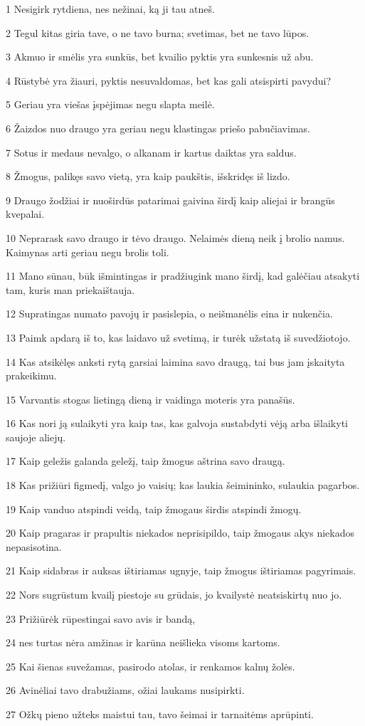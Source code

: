 \par 1 Nesigirk rytdiena, nes nežinai, ką ji tau atneš. 
\par 2 Tegul kitas giria tave, o ne tavo burna; svetimas, bet ne tavo lūpos. 
\par 3 Akmuo ir smėlis yra sunkūs, bet kvailio pyktis yra sunkesnis už abu. 
\par 4 Rūstybė yra žiauri, pyktis nesuvaldomas, bet kas gali atsispirti pavydui? 
\par 5 Geriau yra viešas įspėjimas negu slapta meilė. 
\par 6 Žaizdos nuo draugo yra geriau negu klastingas priešo pabučiavimas. 
\par 7 Sotus ir medaus nevalgo, o alkanam ir kartus daiktas yra saldus. 
\par 8 Žmogus, palikęs savo vietą, yra kaip paukštis, išskridęs iš lizdo. 
\par 9 Draugo žodžiai ir nuoširdūs patarimai gaivina širdį kaip aliejai ir brangūs kvepalai. 
\par 10 Neprarask savo draugo ir tėvo draugo. Nelaimės dieną neik į brolio namus. Kaimynas arti geriau negu brolis toli. 
\par 11 Mano sūnau, būk išmintingas ir pradžiugink mano širdį, kad galėčiau atsakyti tam, kuris man priekaištauja. 
\par 12 Supratingas numato pavojų ir pasislepia, o neišmanėlis eina ir nukenčia. 
\par 13 Paimk apdarą iš to, kas laidavo už svetimą, ir turėk užstatą iš suvedžiotojo. 
\par 14 Kas atsikėlęs anksti rytą garsiai laimina savo draugą, tai bus jam įskaityta prakeikimu. 
\par 15 Varvantis stogas lietingą dieną ir vaidinga moteris yra panašūs. 
\par 16 Kas nori ją sulaikyti yra kaip tas, kas galvoja sustabdyti vėją arba išlaikyti saujoje aliejų. 
\par 17 Kaip geležis galanda geležį, taip žmogus aštrina savo draugą. 
\par 18 Kas prižiūri figmedį, valgo jo vaisių; kas laukia šeimininko, sulaukia pagarbos. 
\par 19 Kaip vanduo atspindi veidą, taip žmogaus širdis atspindi žmogų. 
\par 20 Kaip pragaras ir prapultis niekados neprisipildo, taip žmogaus akys niekados nepasisotina. 
\par 21 Kaip sidabras ir auksas ištiriamas ugnyje, taip žmogus ištiriamas pagyrimais. 
\par 22 Nors sugrūstum kvailį piestoje su grūdais, jo kvailystė neatsiskirtų nuo jo. 
\par 23 Prižiūrėk rūpestingai savo avis ir bandą, 
\par 24 nes turtas nėra amžinas ir karūna neišlieka visoms kartoms. 
\par 25 Kai šienas suvežamas, pasirodo atolas, ir renkamos kalnų žolės. 
\par 26 Avinėliai tavo drabužiams, ožiai laukams nusipirkti. 
\par 27 Ožkų pieno užteks maistui tau, tavo šeimai ir tarnaitėms aprūpinti.



